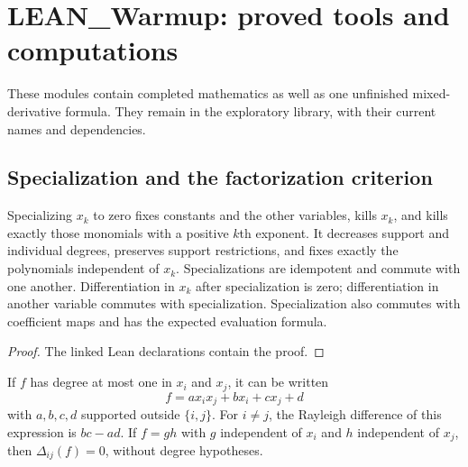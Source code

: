 \chapter{LEAN\_Warmup: proved tools and computations}

These modules contain completed mathematics as well as one unfinished mixed-derivative
formula. They remain in the exploratory library, with their current names and dependencies.

\section{Specialization and the factorization criterion}

\begin{lemma}

\label{lem:setzero-api}


\leanok


Specializing $x_k$ to zero fixes constants and the other variables, kills $x_k$,
and kills exactly those monomials with a positive $k$th exponent. It decreases support
and individual degrees, preserves support restrictions, and fixes exactly the polynomials
independent of $x_k$. Specializations are idempotent and commute with one another.
Differentiation in $x_k$ after specialization is zero; differentiation in another variable
commutes with specialization. Specialization also commutes with coefficient maps and
has the expected evaluation formula.

\end{lemma}

\begin{proof}

\leanok

The linked Lean declarations contain the proof.

\end{proof}

\begin{lemma}

\label{lem:bilinear}


\leanok


If $f$ has degree at most one in $x_i$ and $x_j$, it can be written
\[ f=ax_ix_j+bx_i+cx_j+d \]
with $a,b,c,d$ supported outside $\{i,j\}$. For $i\ne j$, the Rayleigh difference of
this expression is $bc-ad$. If $f=gh$ with $g$ independent of $x_i$ and $h$ independent
of $x_j$, then $\Delta_{ij}(f)=0$, without degree hypotheses.

\end{lemma}


